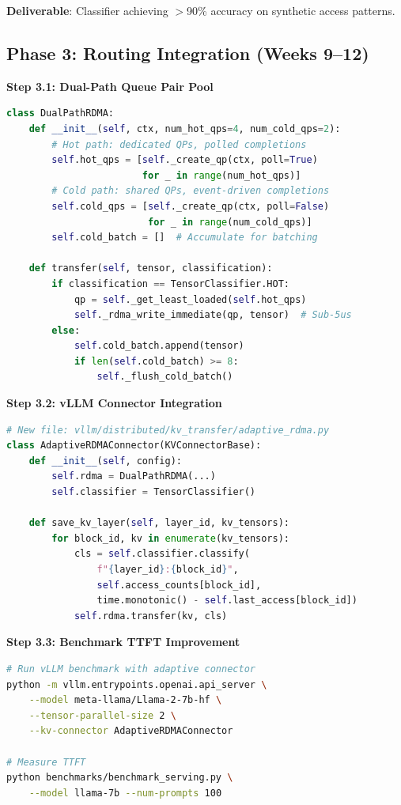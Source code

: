 \documentclass[10pt,letterpaper]{article}
\begin{document}
\textbf{Deliverable}: Classifier achieving $>$90\% accuracy on synthetic access patterns.

\subsection{Phase 3: Routing Integration (Weeks 9--12)}

\textbf{Step 3.1: Dual-Path Queue Pair Pool}
\begin{lstlisting}[language=Python]
class DualPathRDMA:
    def __init__(self, ctx, num_hot_qps=4, num_cold_qps=2):
        # Hot path: dedicated QPs, polled completions
        self.hot_qps = [self._create_qp(ctx, poll=True) 
                        for _ in range(num_hot_qps)]
        # Cold path: shared QPs, event-driven completions
        self.cold_qps = [self._create_qp(ctx, poll=False) 
                         for _ in range(num_cold_qps)]
        self.cold_batch = []  # Accumulate for batching
        
    def transfer(self, tensor, classification):
        if classification == TensorClassifier.HOT:
            qp = self._get_least_loaded(self.hot_qps)
            self._rdma_write_immediate(qp, tensor)  # Sub-5us
        else:
            self.cold_batch.append(tensor)
            if len(self.cold_batch) >= 8:
                self._flush_cold_batch()
\end{lstlisting}

\textbf{Step 3.2: vLLM Connector Integration}
\begin{lstlisting}[language=Python]
# New file: vllm/distributed/kv_transfer/adaptive_rdma.py
class AdaptiveRDMAConnector(KVConnectorBase):
    def __init__(self, config):
        self.rdma = DualPathRDMA(...)
        self.classifier = TensorClassifier()
        
    def save_kv_layer(self, layer_id, kv_tensors):
        for block_id, kv in enumerate(kv_tensors):
            cls = self.classifier.classify(
                f"{layer_id}:{block_id}", 
                self.access_counts[block_id],
                time.monotonic() - self.last_access[block_id])
            self.rdma.transfer(kv, cls)
\end{lstlisting}

\textbf{Step 3.3: Benchmark TTFT Improvement}
\begin{lstlisting}[language=bash]
# Run vLLM benchmark with adaptive connector
python -m vllm.entrypoints.openai.api_server \
    --model meta-llama/Llama-2-7b-hf \
    --tensor-parallel-size 2 \
    --kv-connector AdaptiveRDMAConnector

# Measure TTFT
python benchmarks/benchmark_serving.py \
    --model llama-7b --num-prompts 100
\end{lstlisting}
\end{document}
